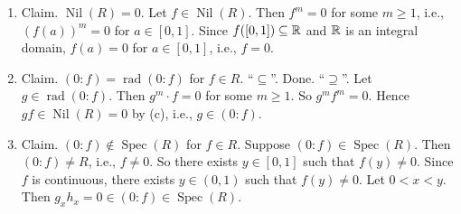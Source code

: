 \begin{example}
\begin{enumerate}
            \begin{center}
                \ \ \ \ \ \ \ \ \ \ \ \
            \end{center}
        \item Claim. $\operatorname{Nil}(R) = 0$. Let $f \in \operatorname{Nil}(R)$. Then $f^{m} = 0$ for some $m \geq 1$, i.e., $(f(a))^{m} = 0$ for $a \in [0,1]$. Since $f([0,1]) \subseteq \mathbb{R}$ and $\mathbb{R}$ is an integral domain, $f(a) = 0$ for $a \in [0,1]$, i.e., $f= 0$.
        \item Claim. $(0:f) = \operatorname{rad}(0:f)$ for $f \in R$. ``$\subseteq$''. Done. ``$\supseteq$''. Let $g \in \operatorname{rad}(0:f)$. Then $g^{m} \cdot f = 0$ for some $m \geq 1$. So $g^{m}f^{m} = 0$. Hence $gf \in \operatorname{Nil}(R) = 0$ by (c), i.e., $g \in (0:f)$. 
        \item Claim. $(0:f) \not \in \operatorname{Spec}(R)$ for $f \in R$. Suppose $(0:f) \in \operatorname{Spec}(R)$. Then $(0:f) \neq R$, i.e., $f \neq 0$. So there exists $y \in [0,1]$ such that $f(y) \neq 0$. Since $f$ is continuous, there exists $y \in (0,1)$ such that $f(y) \neq 0$. Let $0 < x < y$. Then $g_xh_x = 0 \in (0:f) \in \operatorname{Spec}(R)$. 
            \begin{center}
\end{center}
\end{enumerate}
\end{example}
